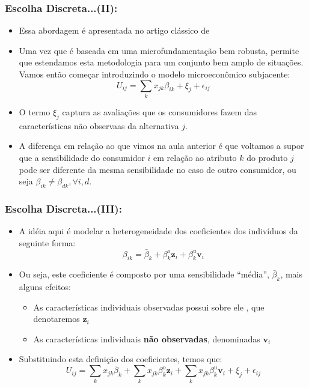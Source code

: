 \documentclass{beamer}
\begin{document}
\begin{frame}\frametitle{Escolha Discreta...(II):}

\begin{itemize}
\item Essa abordagem é apresentada no artigo clássico de \citet{Berry1995}	
\item Uma vez que é baseada em uma microfundamentação bem robusta, permite
que estendamos esta metodologia para um conjunto bem amplo de situações.
Vamos então começar introduzindo o modelo microeconômico subjacente:
\[
U_{ij}=\sum_{k}x_{jk}\beta_{ik}+\xi_{j}+\epsilon_{ij}
\]
\item O termo $\xi_{j}$ captura as avaliações que os consumidores fazem
das características não observaas da alternativa $j$. 
\item A diferença em relação ao que vimos na aula anterior é que voltamos
a supor que a sensibilidade do consumidor $i$ em relação ao atributo
$k$ do produto $j$ pode ser diferente da mesma sensibilidade no
caso de outro consumidor, ou seja $\beta_{ik}\neq\beta_{dk},\forall i,d$. 
\end{itemize}
\end{frame}

\begin{frame}\frametitle{Escolha Discreta...(III):}

\begin{itemize}
\item A idéia aqui é modelar a heterogeneidade dos coeficientes dos indivíduos
da seguinte forma:
\[
\beta_{ik}=\bar{\beta}_{k}+\beta_{k}^{o}\mathbf{z}_{i}+\beta_{k}^{u}\mathbf{v}_{i}
\]
\item Ou seja, este coeficiente é composto por uma sensibilidade ``média'',
$\bar{\beta}_{k}$, mais alguns efeitos:

\begin{itemize}
\item As características individuais observadas possui sobre ele , que denotaremos
$\mathbf{z}_{i}$
\item As características individuais \textbf{não observadas}, denominadas
$\mathbf{v}_{i}$
\end{itemize}
\item Substituindo esta definição dos coeficientes, temos que:
\[
U_{ij}=\sum_{k}x_{jk}\bar{\beta}_{k}+\sum_{k}x_{jk}\beta_{k}^{o}\mathbf{z}_{i}+\sum_{k}x_{jk}\beta_{k}^{u}\mathbf{v}_{i}+\xi_{j}+\epsilon_{ij}
\]
\end{itemize}
\end{frame}
\end{document}
